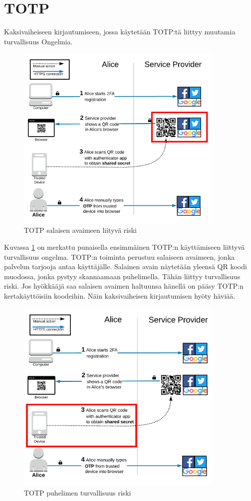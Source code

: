 \section{TOTP}

Kaksivaiheiseen kirjautumiseen, jossa käytetään TOTP:tä liittyy muutamia turvallisuus Ongelmia.

\begin{figure}[ht]
    \centering
    \includegraphics[width=10cm]{template/figures/TOTP service-provider-compromise.png}
    \caption{TOTP salaisen avaimeen liityvä riski \citep{TOTP}}
    \label{fig:TOTP_service_provider}
\end{figure}

Kuvassa \ref{fig:TOTP_service_provider} on merkattu punaisella ensimmäinen TOTP:n käyttämiseen liittyvä turvallisuus ongelma. TOTP:n toiminta perustuu salaiseen avaimeen, jonka palvelun tarjooja antaa käyttäjälle. Salainen avain näytetään yleensä QR koodi muodossa, jonka pystyy skannaamaan puhelimella. Tähän liittyy turvallisuus riski. Jos hyökkääjä saa salaisen avaimen haltuunsa hänellä on pääsy TOTP:n kertakäyttöisiin koodeihin. Näin kaksivaiheisen kirjautumisen hyöty häviää. 

\begin{figure}
    \centering
    \includegraphics[width=10cm]{template/figures/TOTP trusted-device-compromise.png}
    \caption{TOTP puhelimen turvallisuus riski \citep{TOTP}}
    \label{fig:TOTP_device}
\end{figure}


